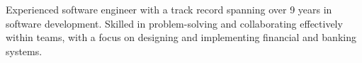 

\begin{cvparagraph}

    Experienced software engineer with a track record spanning over 9 years in software development.
    Skilled in problem-solving and collaborating effectively within teams, with a focus on designing and implementing financial and banking systems.
\end{cvparagraph}
